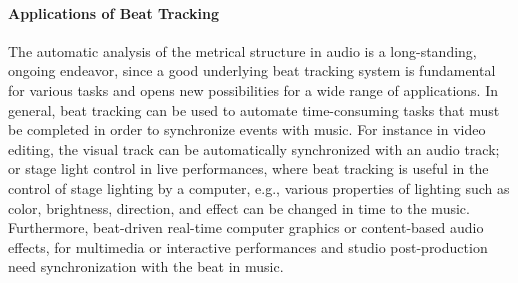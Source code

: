 \documentclass{scrartcl}
\begin{document}






\paragraph{Applications of Beat Tracking}

The automatic analysis of the metrical structure in audio is a long-standing, ongoing endeavor, since a good underlying beat tracking system is fundamental for various tasks and opens new possibilities for a wide range of applications. In general, beat tracking can be used to automate time-consuming tasks that must be completed in order to synchronize events with music. For instance in video editing, the visual track can be automatically synchronized with an audio track; or stage light control in live performances, where beat tracking is useful in the control of stage lighting by a computer, e.g., various properties of lighting such as color, brightness, direction, and effect can be changed in time to the music. Furthermore, beat-driven real-time computer graphics or content-based audio effects, for multimedia or interactive performances and studio post-production need synchronization with the beat in music.
\end{document}
